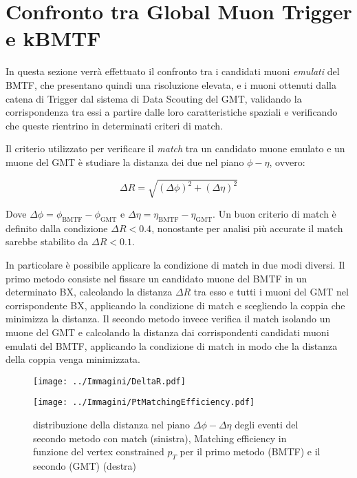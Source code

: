 \section{Confronto tra Global Muon Trigger e kBMTF}
\label{sec:Confronto}

In questa sezione verrà effettuato il confronto tra i candidati muoni \textit{emulati} del BMTF, che presentano quindi una risoluzione elevata, e i muoni ottenuti dalla catena di Trigger dal sistema di Data Scouting del GMT, validando la corrispondenza tra essi a partire dalle loro caratteristiche spaziali e verificando che queste rientrino in determinati criteri di match. 

Il criterio utilizzato per verificare il \textit{match} tra un candidato muone emulato e un muone del GMT è studiare la distanza dei due nel piano $\phi - \eta$, ovvero:

\begin{equation}
  \label{eq:DeltaR}
  \Delta R = \sqrt{(\Delta \phi)^2 + (\Delta \eta)^2}
\end{equation}

Dove $\Delta \phi = \phi_{\mathrm{BMTF}} - \phi_{\mathrm{GMT}}$ e $\Delta \eta = \eta_{\mathrm{BMTF}} - \eta_{\mathrm{GMT}}$. Un buon criterio di match è definito dalla condizione $\Delta R < 0.4$, nonostante per analisi più accurate il match sarebbe stabilito da $\Delta R < 0.1$.

In particolare è possibile applicare la condizione di match in due modi diversi. Il primo metodo consiste nel fissare un candidato muone del BMTF in un determinato BX, calcolando la distanza $\Delta R$ tra esso e tutti i muoni del GMT nel corrispondente BX, applicando la condizione di match e scegliendo la coppia che minimizza la distanza. \newline
Il secondo metodo invece verifica il match isolando un muone del GMT e calcolando la distanza dai corrispondenti candidati muoni emulati del BMTF, applicando la condizione di match in modo che la distanza della coppia venga minimizzata.




\begin{figure}[t]
  \centering
  \begin{minipage}[b]{0.49\textwidth}
    \centering
    \texttt{[image: ../Immagini/DeltaR.pdf]} 
    \end{minipage}
    \hfill 
    \begin{minipage}[b]{0.46\textwidth}
      \centering
      \texttt{[image: ../Immagini/PtMatchingEfficiency.pdf]} 
    \end{minipage}
    \caption{distribuzione della distanza nel piano $\Delta \phi - \Delta \eta$ degli eventi del secondo metodo con match (sinistra), Matching efficiency in funzione del vertex constrained $p_T$ per il primo metodo (BMTF) e il secondo (GMT) (destra)}
  \label{fig:DeltaR}
\end{figure}


